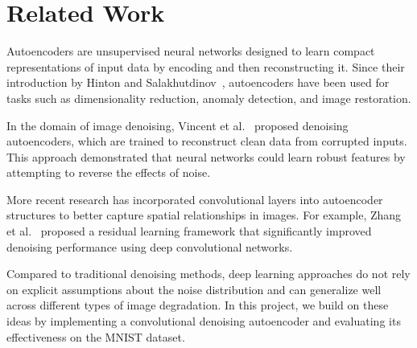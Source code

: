 \section{Related Work}

Autoencoders are unsupervised neural networks designed to learn compact representations of input data by encoding and then reconstructing it. Since their introduction by Hinton and Salakhutdinov~\cite{hinton2006reducing}, autoencoders have been used for tasks such as dimensionality reduction, anomaly detection, and image restoration.

In the domain of image denoising, Vincent et al.~\cite{vincent2008dae} proposed denoising autoencoders, which are trained to reconstruct clean data from corrupted inputs. This approach demonstrated that neural networks could learn robust features by attempting to reverse the effects of noise.

More recent research has incorporated convolutional layers into autoencoder structures to better capture spatial relationships in images. For example, Zhang et al.~\cite{zhang2017beyond} proposed a residual learning framework that significantly improved denoising performance using deep convolutional networks.

Compared to traditional denoising methods, deep learning approaches do not rely on explicit assumptions about the noise distribution and can generalize well across different types of image degradation. In this project, we build on these ideas by implementing a convolutional denoising autoencoder and evaluating its effectiveness on the MNIST dataset.